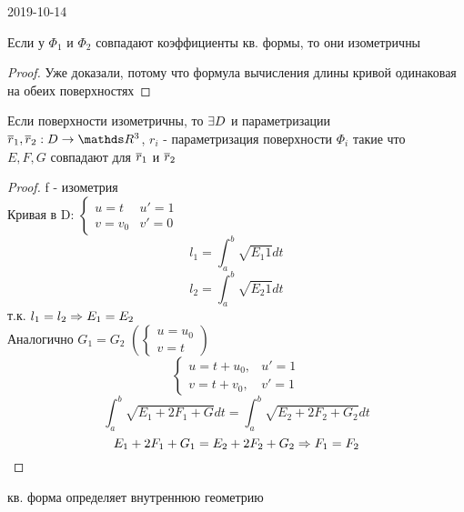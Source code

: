 \documentclass[main]{subfiles}
\begin{document}
\begin{lect} {2019-10-14}
	  \begin{theorem}
	    Если у $\Phi_1$ и $\Phi_2$ совпадают коэффициенты  кв. формы, то они изометричны
	  \end{theorem}

	  \begin{proof}
	    Уже доказали, потому что формула вычисления длины кривой одинаковая на обеих поверхностях
	  \end{proof}

	  \begin{remark}
	    Если поверхности изометричны, то $\exists D$ и параметризации\\
        $\ol{r}_1, \ol{r}_2: D \ra \R^3$, $r_i$ - параметризация поверхности $\Phi_i$ такие что\\
        $E,F,G$ совпадают для $\overline{r}_1$ и $\overline{r}_2$
	  \end{remark}

	  \begin{proof}
	    f - изометрия\\
	    Кривая в D: $\begin{cases}
	      u = t & u'=1\\
	      v=v_0  & v'=0
	    \end{cases}$
	    \[l_1 = \int_a^b \sqrt{E_1 1} dt\]
	    \[l_2 = \int_a^b \sqrt{E_2 1} dt\]
	    т.к. $l_1 = l_2 \Rightarrow E_1 = E_2$\\
	    Аналогично $G_1 = G_2$ $\left(\begin{cases}
	      u=u_0\\
	      v=t
	    \end{cases}\right)$
	    \[\begin{cases}
	      u = t + u_0, & u' = 1\\
	      v = t + v_0, & v' = 1
	    \end{cases}\]
	    \[\int_a^b \sqrt{E_1 + 2 F_1 + G} dt = \int_a^b \sqrt{E_2 + 2F_2 + G_2} dt\]
	    \[E_1 + 2F_1 + G_1 = E_2+ 2 F_2 + G_2 \Rightarrow F_1 = F_2\]
	  \end{proof}

	  \begin{consequence}
	     кв. форма определяет внутреннюю геометрию
	  \end{consequence}



\end{lect}
\end{document}
